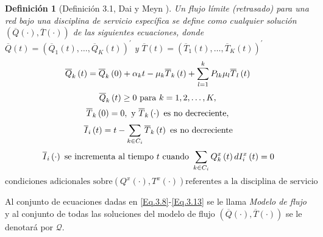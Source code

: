 \documentclass{article}
\newtheorem{Def}{Definición}
\begin{document}
\begin{Def}[Definici\'on 3.1, Dai y Meyn \cite{DaiSean}]
Un flujo l\'imite (retrasado) para una red bajo una disciplina de
servicio espec\'ifica se define como cualquier soluci\'on
 $\left(\overline{Q}\left(\cdot\right),\overline{T}\left(\cdot\right)\right)$ de las siguientes ecuaciones, donde
$\overline{Q}\left(t\right)=\left(\overline{Q}_{1}\left(t\right),\ldots,\overline{Q}_{K}\left(t\right)\right)^{'}$
y
$\overline{T}\left(t\right)=\left(\overline{T}_{1}\left(t\right),\ldots,\overline{T}_{K}\left(t\right)\right)^{'}$
\begin{equation}\label{Eq.3.8}
\overline{Q}_{k}\left(t\right)=\overline{Q}_{k}\left(0\right)+\alpha_{k}t-\mu_{k}\overline{T}_{k}\left(t\right)+\sum_{l=1}^{k}P_{lk}\mu_{l}\overline{T}_{l}\left(t\right)\\
\end{equation}
\begin{equation}\label{Eq.3.9}
\overline{Q}_{k}\left(t\right)\geq0\textrm{ para }k=1,2,\ldots,K,\\
\end{equation}
\begin{equation}\label{Eq.3.10}
\overline{T}_{k}\left(0\right)=0,\textrm{ y }\overline{T}_{k}\left(\cdot\right)\textrm{ es no decreciente},\\
\end{equation}
\begin{equation}\label{Eq.3.11}
\overline{I}_{i}\left(t\right)=t-\sum_{k\in C_{i}}\overline{T}_{k}\left(t\right)\textrm{ es no decreciente}\\
\end{equation}
\begin{equation}\label{Eq.3.12}
\overline{I}_{i}\left(\cdot\right)\textrm{ se incrementa al tiempo }t\textrm{ cuando }\sum_{k\in C_{i}}Q_{k}^{x}\left(t\right)dI_{i}^{x}\left(t\right)=0\\
\end{equation}
\begin{equation}\label{Eq.3.13}
\textrm{condiciones adicionales sobre
}\left(Q^{x}\left(\cdot\right),T^{x}\left(\cdot\right)\right)\textrm{
referentes a la disciplina de servicio}
\end{equation}
\end{Def}

Al conjunto de ecuaciones dadas en \ref{Eq.3.8}-\ref{Eq.3.13} se
le llama {\em Modelo de flujo} y al conjunto de todas las
soluciones del modelo de flujo
$\left(\overline{Q}\left(\cdot\right),\overline{T}
\left(\cdot\right)\right)$ se le denotar\'a por $\mathcal{Q}$.
\end{document}
